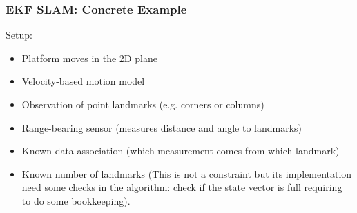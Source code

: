 \begin{frame}
    \frametitle{EKF SLAM: Concrete Example}

    Setup:
    \begin{itemize}
        \item Platform moves in the 2D plane
        \item Velocity-based motion model
        \item Observation of point landmarks (e.g. corners or columns)
        \item Range-bearing sensor (measures distance and angle to landmarks)
        \item Known data association (which measurement comes from which landmark)
        \item Known number of landmarks (This is not a constraint but its implementation need some checks in the algorithm: check if the state vector is full requiring to do some bookkeeping). 
    \end{itemize}
\end{frame}

